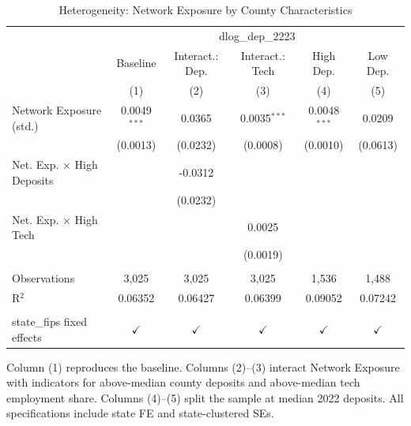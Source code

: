 \begin{table}[htbp]
   \caption{\label{tab:hetero} Heterogeneity: Network Exposure by County Characteristics}
   \bigskip
   \centering
   \footnotesize\begin{tabular}{lccccc}
      \toprule
       & \multicolumn{5}{c}{dlog\_dep\_2223}\\
                                        & Baseline       & Interact.: Dep. & Interact.: Tech & High Dep.      & Low Dep. \\   
                                        & (1)            & (2)             & (3)             & (4)            & (5)\\  
      \midrule 
      Network Exposure (std.)           & 0.0049$^{***}$ & 0.0365          & 0.0035$^{***}$  & 0.0048$^{***}$ & 0.0209\\   
                                        & (0.0013)       & (0.0232)        & (0.0008)        & (0.0010)       & (0.0613)\\   
      Net. Exp. $\times$ High Deposits  &                & -0.0312         &                 &                &   \\   
                                        &                & (0.0232)        &                 &                &   \\   
      Net. Exp. $\times$ High Tech      &                &                 & 0.0025          &                &   \\   
                                        &                &                 & (0.0019)        &                &   \\   
       \\
      Observations                      & 3,025          & 3,025           & 3,025           & 1,536          & 1,488\\  
      R$^2$                             & 0.06352        & 0.06427         & 0.06399         & 0.09052        & 0.07242\\  
       \\
      state\_fips fixed effects         & $\checkmark$   & $\checkmark$    & $\checkmark$    & $\checkmark$   & $\checkmark$\\   
      \bottomrule
   \end{tabular}
   
   \par \raggedright 
   Column (1) reproduces the baseline. Columns (2)--(3) interact Network Exposure with indicators for above-median county deposits and above-median tech employment share. Columns (4)--(5) split the sample at median 2022 deposits. All specifications include state FE and state-clustered SEs.
\end{table}
